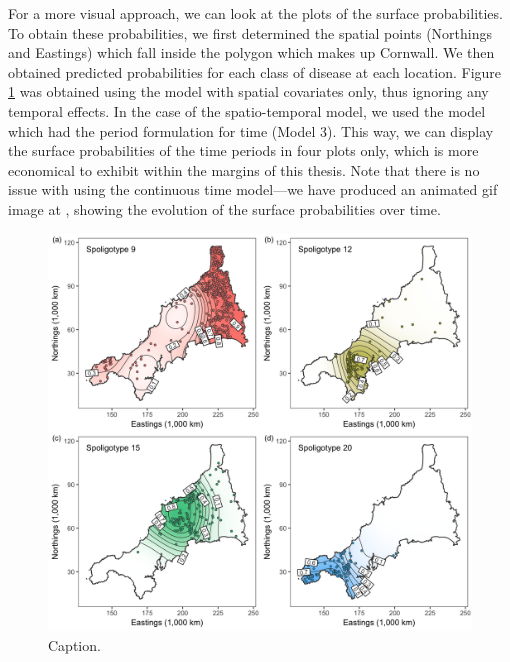 \documentclass[a4paper,showframe,11pt]{report}\usepackage[]{graphicx}\usepackage[]{color}
\makeatletter
\newenvironment{kframe}{%
 \def\at@end@of@kframe{}%
 \ifinner\ifhmode%
  \def\at@end@of@kframe{\end{minipage}}%
  \begin{minipage}{\columnwidth}%
 \fi\fi%
 \def\FrameCommand##1{\hskip\@totalleftmargin \hskip-\fboxsep
 \colorbox{shadecolor}{##1}\hskip-\fboxsep
     \hskip-\linewidth \hskip-\@totalleftmargin \hskip\columnwidth}%
 \MakeFramed {\advance\hsize-\width
   \@totalleftmargin\z@ \linewidth\hsize
   \@setminipage}}%
 {\par\unskip\endMakeFramed%
 \at@end@of@kframe}
\newenvironment{knitrout}{}{} %
\makeatother
\begin{document}
For a more visual approach, we can look at the plots of the surface probabilities.
To obtain these probabilities, we first determined the spatial points (Northings and Eastings) which fall inside the polygon which makes up Cornwall.
We then obtained predicted probabilities for each class of disease at each location.
Figure \ref{fig:plot.btb} was obtained using the model with spatial covariates only, thus ignoring any temporal effects.
In the case of the spatio-temporal model, we used the model which had the period formulation for time (Model 3).
This way, we can display the surface probabilities of the time periods in four plots only, which is more economical to exhibit within the margins of this thesis.
Note that there is no issue with using the continuous time model---we have produced an animated gif image at , showing the evolution of the surface probabilities over time.

\begin{knitrout}
\color{fgcolor}\begin{kframe}
\singlespacing\end{kframe}\begin{figure}[p]

{\centering \includegraphics[width=\linewidth]{figure/05-plot_btb-1} 

}

\caption[Caption]{Caption.}\label{fig:plot.btb}
\end{figure}


\end{knitrout}
\end{document}

